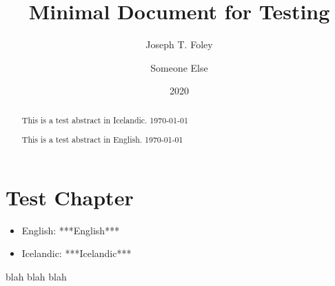 \documentclass{memoir}
\title{Minimal Document for Testing}
\author{Joseph T. Foley \and Someone Else}
\date{2020}{2}{2}
\begin{document}




\maketitle

\begin{abstract}
  This is a test abstract in Icelandic.
  \today
\end{abstract}

\begin{abstract}
  This is a test abstract in English.
  \today
\end{abstract}

\newpage
\chapter{Test Chapter}
\newcommand{\varEN}{***English***}
\newcommand{\varIS}{***Icelandic***}
{ 
  \renewcommand{\varIS}{#1}
  \renewcommand{\varEN}{#2}
}
  
  \begin{itemize}
  \item English: \varEN{}
  \item Icelandic: \varIS{}
  \end{itemize}


blah blah blah

\end{document}
